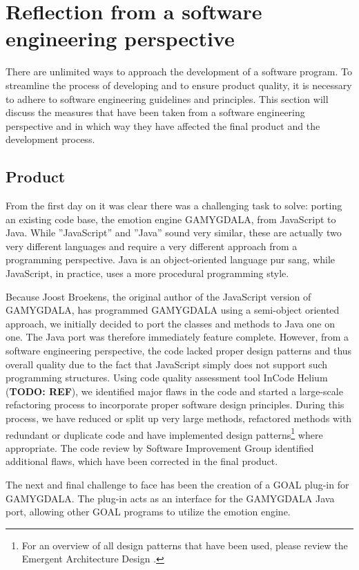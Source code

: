\section{Reflection from a software engineering perspective}
There are unlimited ways to approach the development of a software program. To streamline the process of developing and to ensure product quality, it is necessary to adhere to software engineering guidelines and principles. This section will discuss the measures that have been taken from a software engineering perspective and in which way they have affected the final product and the development process.


\subsection{Product}
From the first day on it was clear there was a challenging task to solve: porting an existing code base, the emotion engine GAMYGDALA, from JavaScript to Java. While ''JavaScript'' and ''Java'' sound very similar, these are actually two very different languages and require a very different approach from a programming perspective. Java is an object-oriented language pur sang, while JavaScript, in practice, uses a more procedural programming style.

Because Joost Broekens, the original author of the JavaScript version of GAMYGDALA, has programmed GAMYGDALA using a semi-object oriented approach, we initially decided to port the classes and methods to Java one on one. The Java port was therefore immediately feature complete. However, from a software engineering perspective, the code lacked proper design patterns and thus overall quality due to the fact that JavaScript simply does not support such  programming structures. Using code quality assessment tool InCode Helium (\textbf{TODO: REF}), we identified major flaws in the code and started a large-scale refactoring process to incorporate proper software design principles. During this process, we have reduced or split up very large methods, refactored methods with redundant or duplicate code and have implemented design patterns\footnote{For an overview of all design patterns that have been used, please review the Emergent Architecture Design \citep{ead}.} where appropriate. The code review by Software Improvement Group identified additional flaws, which have been corrected in the final product.

The next and final challenge to face has been the creation of a GOAL \citep{goal} plug-in for GAMYGDALA. The plug-in acts as an interface for the GAMYGDALA Java port, allowing other GOAL programs to utilize the emotion engine.

